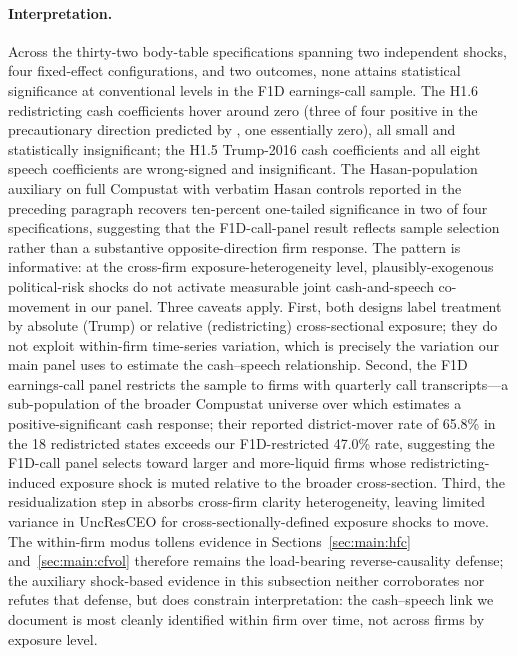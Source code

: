 \paragraph{Interpretation.}
Across the thirty-two body-table specifications spanning two independent shocks, four fixed-effect configurations, and two outcomes, none attains statistical significance at conventional levels in the F1D earnings-call sample. The H1.6 redistricting cash coefficients hover around zero (three of four positive in the precautionary direction predicted by , one essentially zero), all small and statistically insignificant; the H1.5 Trump-2016 cash coefficients and all eight speech coefficients are wrong-signed and insignificant. The Hasan-population auxiliary on full Compustat with verbatim Hasan controls reported in the preceding paragraph recovers ten-percent one-tailed significance in two of four specifications, suggesting that the F1D-call-panel result reflects sample selection rather than a substantive opposite-direction firm response. The pattern is informative: at the cross-firm exposure-heterogeneity level, plausibly-exogenous political-risk shocks do not activate measurable joint cash-and-speech co-movement in our panel. Three caveats apply. First, both designs label treatment by absolute (Trump) or relative (redistricting) cross-sectional exposure; they do not exploit within-firm time-series variation, which is precisely the variation our main panel uses to estimate the cash--speech relationship. Second, the F1D earnings-call panel restricts the sample to firms with quarterly call transcripts---a sub-population of the broader Compustat universe over which  estimates a positive-significant cash response; their reported district-mover rate of 65.8\% in the 18 redistricted states exceeds our F1D-restricted 47.0\% rate, suggesting the F1D-call panel selects toward larger and more-liquid firms whose redistricting-induced exposure shock is muted relative to the broader cross-section. Third, the residualization step in  absorbs cross-firm clarity heterogeneity, leaving limited variance in UncResCEO for cross-sectionally-defined exposure shocks to move. The within-firm modus tollens evidence in Sections~\ref{sec:main:hfc} and~\ref{sec:main:cfvol} therefore remains the load-bearing reverse-causality defense; the auxiliary shock-based evidence in this subsection neither corroborates nor refutes that defense, but does constrain interpretation: the cash--speech link we document is most cleanly identified within firm over time, not across firms by exposure level.
